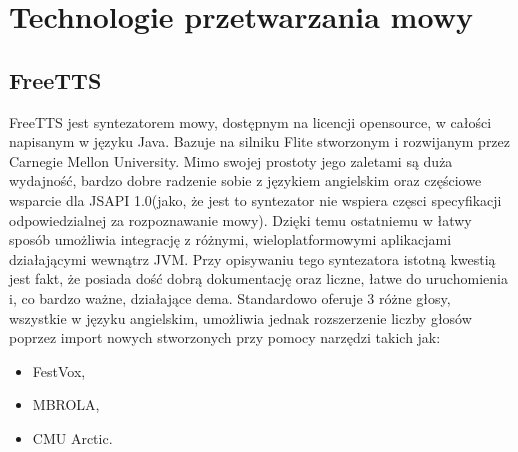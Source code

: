 \section{Technologie przetwarzania mowy}		
\subsection{FreeTTS}
FreeTTS \cite{freettssite} jest syntezatorem mowy, dostępnym na licencji opensource, w całości napisanym w języku Java. Bazuje na silniku Flite stworzonym i rozwijanym przez Carnegie Mellon University. Mimo swojej prostoty jego zaletami są duża wydajność, bardzo dobre radzenie sobie z językiem angielskim oraz częściowe wsparcie dla JSAPI 1.0(jako, że jest to syntezator nie wspiera częsci specyfikacji odpowiedzialnej za rozpoznawanie mowy). Dzięki temu ostatniemu w łatwy sposób umożliwia integrację z różnymi, wieloplatformowymi aplikacjami działającymi wewnątrz JVM. Przy opisywaniu tego syntezatora istotną kwestią jest fakt, że posiada dość dobrą dokumentację oraz liczne, łatwe do uruchomienia i, co bardzo ważne, działające dema. Standardowo oferuje 3 różne głosy, wszystkie w języku angielskim, umożliwia jednak rozszerzenie liczby głosów poprzez import nowych stworzonych przy pomocy narzędzi takich jak:
\begin{itemize}
	\item FestVox,
	\item MBROLA,
	\item CMU Arctic.
\end{itemize}    

